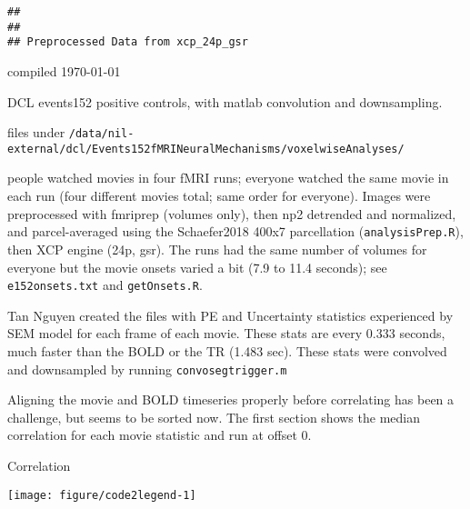 \documentclass[letterpaper]{article}\usepackage[]{graphicx}\usepackage[]{xcolor}
\makeatletter
\def\maxwidth{ %
  \ifdim\Gin@nat@width>\linewidth
    \linewidth
  \else
    \Gin@nat@width
  \fi
}
\newenvironment{kframe}{%
 \def\at@end@of@kframe{}%
 \ifinner\ifhmode%
  \def\at@end@of@kframe{\end{minipage}}%
  \begin{minipage}{\columnwidth}%
 \fi\fi%
 \def\FrameCommand##1{\hskip\@totalleftmargin \hskip-\fboxsep
 \colorbox{shadecolor}{##1}\hskip-\fboxsep
     \hskip-\linewidth \hskip-\@totalleftmargin \hskip\columnwidth}%
 \MakeFramed {\advance\hsize-\width
   \@totalleftmargin\z@ \linewidth\hsize
   \@setminipage}}%
 {\par\unskip\endMakeFramed%
 \at@end@of@kframe}
\newenvironment{knitrout}{}{} %
\makeatother
\begin{document}
\begin{knitrout}
\color{fgcolor}\begin{kframe}
\begin{verbatim}
## 
## 
## Preprocessed Data from xcp_24p_gsr
\end{verbatim}
\end{kframe}
\end{knitrout}

\noindent compiled \today\  \par
\noindent DCL events152 positive controls, with matlab convolution and downsampling. \par
\noindent files under \texttt{/data/nil-external/dcl/Events152\textunderscore fMRI\textunderscore NeuralMechanisms/voxelwiseAnalyses/} \par
\vspace{0.2 cm} 
 people watched movies in four fMRI runs; everyone watched the same movie in each run (four different movies total; same order for everyone). Images were preprocessed with fmriprep (volumes only), then np2 detrended and normalized, and parcel-averaged using the Schaefer2018 400x7 parcellation (\texttt{analysisPrep.R}), then XCP engine (24p, gsr). The runs had the same number of volumes for everyone but the movie onsets varied a bit (7.9 to 11.4 seconds); see \texttt{e152onsets.txt} and \texttt{getOnsets.R}. \par
\vspace{0.2 cm}
\noindent Tan Nguyen created the files with PE and Uncertainty statistics experienced by SEM model for each frame of each movie. These stats are every 0.333 seconds, much faster than the BOLD or the TR (1.483 sec). These stats were convolved and downsampled by running \texttt{convo\textunderscore seg\textunderscore trigger.m} \par
\vspace{0.2 cm}
\noindent Aligning the movie and BOLD timeseries properly before correlating has been a challenge, but seems to be sorted now. The first section shows the median correlation for each movie statistic and run at offset 0. \par




\newpage
\noindent Correlation  \par
\vspace{0.2 cm} 
\begin{knitrout}
\color{fgcolor}

{\centering \texttt{[image: figure/code2legend-1]} 

}


\end{knitrout}
\vspace{0.2 cm}
\end{document}
